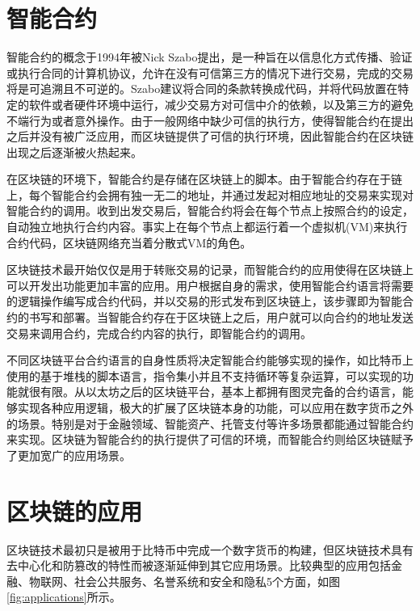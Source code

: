 \section{智能合约}

智能合约的概念于1994年被Nick Szabo提出\cite{szabo1996smart}，是一种旨在以信息化方式传播、验证或执行合同的计算机协议，允许在没有可信第三方的情况下进行交易，完成的交易将是可追溯且不可逆的。Szabo建议将合同的条款转换成代码，并将代码放置在特定的软件或者硬件环境中运行，减少交易方对可信中介的依赖，以及第三方的避免不端行为或者意外操作。由于一般网络中缺少可信的执行方，使得智能合约在提出之后并没有被广泛应用，而区块链提供了可信的执行环境，因此智能合约在区块链出现之后逐渐被火热起来。

在区块链的环境下，智能合约是存储在区块链上的脚本。由于智能合约存在于链上，每个智能合约会拥有独一无二的地址，并通过发起对相应地址的交易来实现对智能合约的调用。收到出发交易后，智能合约将会在每个节点上按照合约的设定，自动独立地执行合约内容。事实上在每个节点上都运行着一个虚拟机(VM)来执行合约代码，区块链网络充当着分散式VM的角色。

区块链技术最开始仅仅是用于转账交易的记录，而智能合约的应用使得在区块链上可以开发出功能更加丰富的应用。用户根据自身的需求，使用智能合约语言将需要的逻辑操作编写成合约代码，并以交易的形式发布到区块链上，该步骤即为智能合约的书写和部署。当智能合约存在于区块链上之后，用户就可以向合约的地址发送交易来调用合约，完成合约内容的执行，即智能合约的调用。


不同区块链平台合约语言的自身性质将决定智能合约能够实现的操作，如比特币上使用的基于堆栈的脚本语言，指令集小并且不支持循环等复杂运算，可以实现的功能就很有限。从以太坊之后的区块链平台，基本上都拥有图灵完备的合约语言，能够实现各种应用逻辑，极大的扩展了区块链本身的功能，可以应用在数字货币之外的场景。特别是对于金融领域、智能资产、托管支付等许多场景都能通过智能合约来实现。区块链为智能合约的执行提供了可信的环境，而智能合约则给区块链赋予了更加宽广的应用场景。



\section{区块链的应用}

区块链技术最初只是被用于比特币中完成一个数字货币的构建，但区块链技术具有去中心化和防篡改的特性而被逐渐延伸到其它应用场景。比较典型的应用包括金融、物联网、社会公共服务、名誉系统和安全和隐私5个方面\cite{zheng2016blockchain}，如图\ref{fig:applications}所示。

